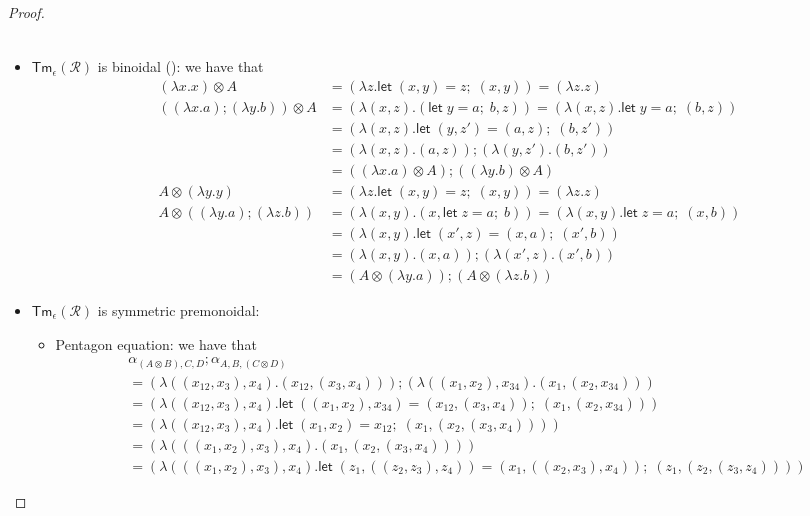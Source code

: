 \documentclass[acmsmall,screen,review]{acmart}
\newcommand{\mc}[1]{\ensuremath{\mathcal{#1}}}
\newcommand{\ms}[1]{\ensuremath{\mathsf{#1}}}
\newcommand{\letexpr}[3]{\ensuremath{\ms{let}\;#1 = #2;\;#3}}
\newcommand{\cmark}{\ding{51}}%
\begin{document}
\begin{proof}
\begin{itemize}
\begin{align*}
  \end{align*}
  \item $\ms{Tm}_\epsilon(\mc{R})$ is binoidal (\cmark): we have that
  \begin{align*}
    (\lambda x . x) \otimes A 
    &= (\lambda z . \letexpr{(x, y)}{z}{(x, y)}) = (\lambda z . z)\
    \\
    ((\lambda x . a) ; (\lambda y . b)) \otimes A
    &= (\lambda (x, z) . (\letexpr{y}{a}{b}, z))
    = (\lambda (x, z) . \letexpr{y}{a}{(b, z)}) \\
    &= (\lambda (x, z) . \letexpr{(y, z')}{(a, z)}{(b, z')}) \\
    &= (\lambda (x, z) . (a, z)) ; (\lambda (y, z') . (b, z')) \\
    &= ((\lambda x . a) \otimes A) ; ((\lambda y  . b) \otimes A) \\
    A \otimes (\lambda y . y)
    &= (\lambda z . \letexpr{(x, y)}{z}{(x, y)}) = (\lambda z . z) \\
    A \otimes ((\lambda y . a) ; (\lambda z . b))
    &= (\lambda (x, y) . (x, \letexpr{z}{a}{b}))
    = (\lambda (x, y) . \letexpr{z}{a}{(x, b)}) \\
    &= (\lambda (x, y) . \letexpr{(x', z)}{(x, a)}{(x', b)}) \\
    &= (\lambda (x, y) . (x, a)) ; (\lambda (x', z) . (x', b)) \\
    &= (A \otimes (\lambda y . a)) ; (A \otimes (\lambda z . b)) 
  \end{align*}
  \item $\ms{Tm}_\epsilon(\mc{R})$ is symmetric premonoidal: 
  \begin{itemize}
    \item Pentagon equation: we have that
    \begin{align*}
      &\alpha_{(A \otimes B), C, D} ; \alpha_{A, B, (C \otimes D)} \\
      &= (\lambda ((x_{12}, x_3), x_4) . (x_{12}, (x_3, x_4))) ; 
         (\lambda ((x_1, x_2), x_{34}) . (x_1, (x_2, x_{34}))) \\
      &= (\lambda ((x_{12}, x_3), x_4) . 
        \letexpr{((x_1, x_2), x_{34})}{(x_{12}, (x_3, x_4))}{(x_1, (x_2, x_{34}))}) \\
      &= (\lambda ((x_{12}, x_3), x_4) . 
        \letexpr{(x_1, x_2)}{x_{12}}{(x_1, (x_2, (x_3, x_4)))}) \\
      &= (\lambda (((x_1, x_2), x_3), x_4) . (x_1, (x_2, (x_3, x_4)))) \\
      &= (\lambda (((x_1, x_2), x_3), x_4) . 
        \letexpr{(z_1, ((z_2, z_3), z_4))}{(x_1, ((x_2, x_3), x_4))}{(z_1, (z_2, (z_3, z_4)))})

\end{align*}
\end{itemize}
\end{itemize}
\end{proof}
\end{document}
